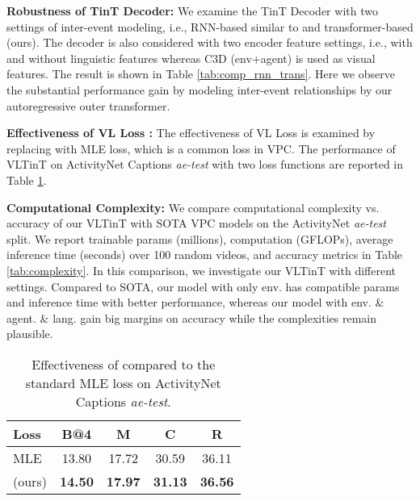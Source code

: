 \documentclass[letterpaper]{article} \usepackage{aaai23}  \usepackage{times}  \usepackage{helvet}  \usepackage{courier}  \usepackage[hyphens]{url}  \usepackage{graphicx} \urlstyle{rm} \def\UrlFont{\rm}  \usepackage{natbib}  \usepackage{caption} \frenchspacing  \setlength{\pdfpagewidth}{8.5in}  \setlength{\pdfpageheight}{11in}  \usepackage{algorithm}
\begin{document}
\vspace{2mm}
\noindent
\textbf{ Robustness of TinT Decoder: } We examine the TinT Decoder with two settings of inter-event modeling, i.e., RNN-based similar to \cite{lei2020mart} and  transformer-based (ours). 
The decoder is also considered with two encoder feature settings, i.e., with and without linguistic features whereas C3D (env+agent) is used as visual features. The result is shown in Table \ref{tab:comp_rnn_trans}. Here we observe the substantial performance gain by modeling inter-event relationships by our autoregressive outer transformer. 

\vspace{2mm}
\noindent
\textbf{ Effectiveness of VL Loss : } The effectiveness of VL Loss is examined by replacing  with MLE loss, which is a common loss in VPC. The performance of VLTinT on ActivityNet Captions \emph{ae-test} with two loss functions are reported in Table \ref{tab:l_clip}.

\vspace{2mm}
\noindent
\textbf{ Computational Complexity: } We compare computational complexity vs. accuracy of our VLTinT with SOTA VPC models on the ActivityNet \emph{ae-test} split. We report trainable params (millions), computation (GFLOPs), average inference time (seconds) over 100 random videos, and accuracy metrics in Table \ref{tab:complexity}. In this comparison, we investigate our VLTinT with different settings. Compared to SOTA, our model with only env. has compatible params and inference time with better performance, whereas our model with env. \& agent. \& lang. gain big margins on accuracy while the complexities remain plausible.









\begin{table}[t]
\centering
\caption{Effectiveness of  compared to the standard MLE loss on ActivityNet Captions \emph{ae-test}. }\begin{tabular}{l|cccc}
\toprule
Loss &  B@4 & M &  C  & R  \\\hline
MLE & 13.80 & 17.72 & 30.59 & 36.11  \\  (ours) & \textbf{14.50} & \textbf{17.97} & \textbf{31.13} & \textbf{36.56} \\ \bottomrule
\end{tabular}
\label{tab:l_clip}
\end{table}
\end{document}
